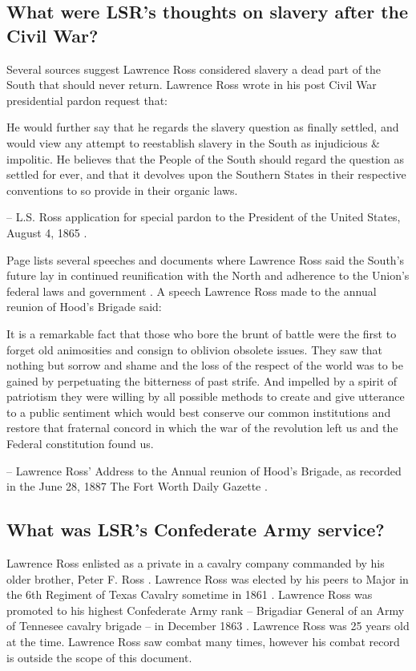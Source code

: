 \documentclass[12pt]{article}
\begin{document}
\subsection{What were LSR's thoughts on slavery after the Civil War?}
Several sources suggest Lawrence Ross considered slavery a dead part of the South that should never return. Lawrence Ross wrote in his post Civil War presidential pardon request that:

\begin{displayquote}
He would further say that he regards the slavery question as finally settled, and would view any attempt to reestablish slavery in the South as injudicious \& impolitic.  He believes that the People of the South should regard the question as settled for ever, and that it devolves upon the Southern States in their respective conventions to so provide in their organic laws.

-- L.S. Ross application for special pardon to the President of the United States, August 4, 1865 \cite{pardonrequest}.
\end{displayquote}

Page lists several speeches and documents where Lawrence Ross said the South's future lay in continued reunification with the North and adherence to the Union's federal laws and government \cite[pg. 161--167]{page}. A speech Lawrence Ross made to the annual reunion of Hood's Brigade said:

\begin{displayquote}
It is a remarkable fact that those who bore the brunt of battle were the first to forget old animosities and consign to oblivion obsolete issues.  They saw that nothing but sorrow and shame and the loss of the respect of the world was to be gained by perpetuating the bitterness of past strife.  And impelled by a spirit of patriotism they were willing by all possible methods to create and give utterance to a public sentiment which would best conserve our common institutions and restore that fraternal concord in which the war of the revolution left us and the Federal constitution found us.

-- Lawrence Ross' Address to the Annual reunion of Hood's Brigade, as recorded in the June 28, 1887 The Fort Worth Daily Gazette \cite{fwg:1887-06-28}.
\end{displayquote}

\subsection{What was LSR's Confederate Army service?}
Lawrence Ross enlisted as a private in a cavalry company commanded by his older brother, Peter F. Ross \cite{rosspapersummary}. Lawrence Ross was elected by his peers to Major in the 6th Regiment of Texas Cavalry sometime in 1861 \cite[pg. 36--37]{texasbrigade}. Lawrence Ross was promoted to his highest Confederate Army rank -- Brigadiar General of an Army of Tennesee cavalry brigade -- in December 1863 \cite{rosspapersummary}. Lawrence Ross was 25 years old at the time. Lawrence Ross saw combat many times, however his combat record is outside the scope of this document. 
\end{document}
